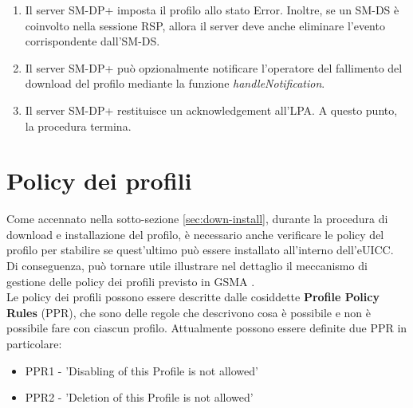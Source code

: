 \documentclass[10pt, oneside]{book}
\begin{document}
\begin{enumerate}
\item Il server SM-DP+ imposta il profilo allo stato Error. Inoltre, se un SM-DS è coinvolto nella sessione RSP, allora il server deve anche eliminare l'evento corrispondente dall'SM-DS.
\item Il server SM-DP+ può opzionalmente notificare l'operatore del fallimento del download del profilo mediante la funzione \textit{handleNotification}.
\item Il server SM-DP+ restituisce un acknowledgement all'LPA. A questo punto, la procedura termina.
\end{enumerate}

\section{Policy dei profili}\label{sec:profile-policy}
Come accennato nella sotto-sezione \ref{sec:down-install}, durante la procedura di download e installazione del profilo, è necessario anche verificare le policy del profilo per stabilire se quest'ultimo può essere installato all'interno dell'eUICC. Di conseguenza, può tornare utile illustrare nel dettaglio il meccanismo di gestione delle policy dei profili previsto in GSMA \cite{GSMA-docs-new}.\\
Le policy dei profili possono essere descritte dalle cosiddette \textbf{Profile Policy Rules} (PPR), che sono delle regole che descrivono cosa è possibile e non è possibile fare con ciascun profilo. Attualmente possono essere definite due PPR in particolare:
\begin{itemize}
\item PPR1 - 'Disabling of this Profile is not allowed'
\item PPR2 - 'Deletion of this Profile is not allowed'
\end{itemize}
\end{document}
